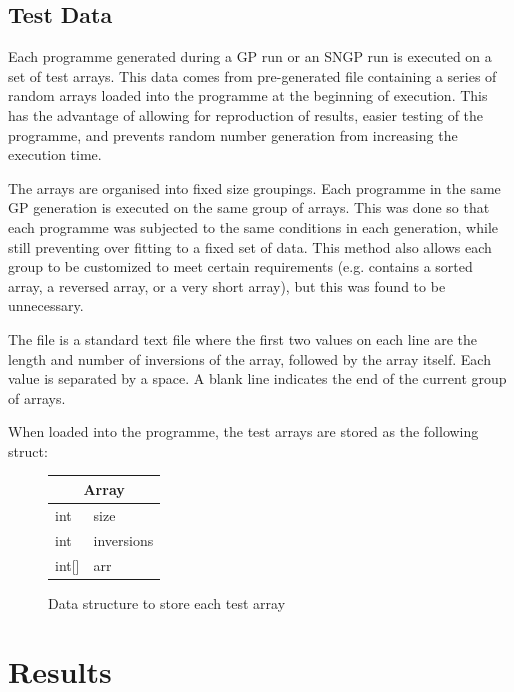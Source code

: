 \documentclass{article}
\begin{document}
    \subsection{Test Data}
        
        Each programme generated during a GP run or an SNGP run is executed on a set of test arrays. This data comes from pre-generated file containing a series of random arrays loaded into the programme at the beginning of execution. This has the advantage of allowing for reproduction of results, easier testing of the programme, and prevents random number generation from increasing the execution time.
        
        The arrays are organised into fixed size groupings. Each programme in the same GP generation is executed on the same group of arrays. This was done so that each programme was subjected to the same conditions in each generation, while still preventing over fitting to a fixed set of data. This method also allows each group to be customized to meet certain requirements (e.g. contains a sorted array, a reversed array, or a very short array), but this was found to be unnecessary.
        
        The file is a standard text file where the first two values on each line are the length and number of inversions of the array, followed by the array itself. Each value is separated by a space. A blank line indicates the end of the current group of arrays.
        
        When loaded into the programme, the test arrays are stored as the following struct:
        
        \begin{figure}[h]
            \centering
            \begin{tabular}{|l l|}
                \hline
                \multicolumn{2}{|c|}{Array}\\
                \hline
                int & size \\
                int & inversions\\
                int[] & arr\\
                \hline
            \end{tabular}
            \caption{Data structure to store each test array}
            
            \label{struct:array}
        \end{figure}

    \section{Results}
\end{document}
